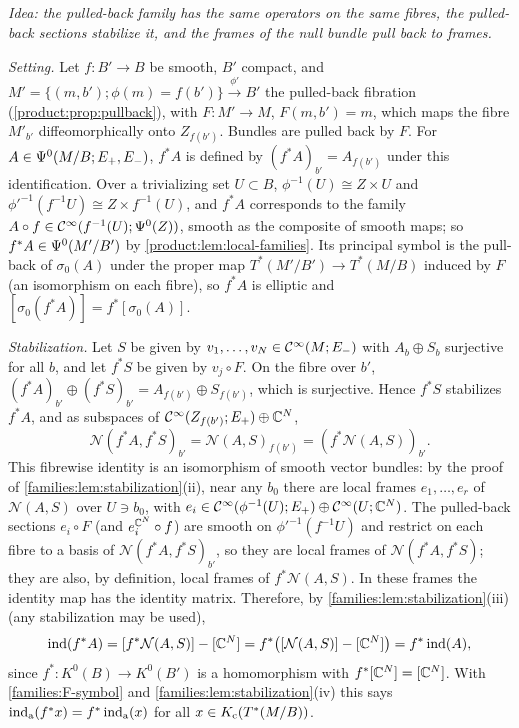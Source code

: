 \subsection*{}
\emph{Idea: the pulled-back family has the same operators on the same fibres, the
pulled-back sections stabilize it, and the frames of the null bundle pull back to
frames.}

\emph{Setting.} Let $f:B'\to B$ be smooth, $B'$ compact, and
$M'=\{(m,b');\phi(m)=f(b')\}\xrightarrow{\phi'}B'$ the pulled-back fibration
(\cref{product:prop:pullback}), with $F:M'\to M$, $F(m,b')=m$, which maps the fibre
$M'_{b'}$ diffeomorphically onto $Z_{f(b')}$. Bundles are pulled back by $F$. For
$A\in\Psi^{0}(M/B;E_+,E_-)$, $f^*A$ is defined by $(f^*A)_{b'}=A_{f(b')}$ under this
identification. Over a trivializing set $U\subset B$, $\phi^{-1}(U)\cong Z\times U$ and
$\phi'^{-1}(f^{-1}U)\cong Z\times f^{-1}(U)$, and $f^*A$ corresponds to the family
$A\circ f\in\mathcal{C}^\infty(f^{-1}(U);\Psi^{0}(Z))$, smooth as the composite of smooth maps; so
$f^*A\in\Psi^{0}(M'/B')$ by \cref{product:lem:local-families}. Its principal symbol is
the pull-back of $\sigma_0(A)$ under the proper map $T^*(M'/B')\to T^*(M/B)$ induced by
$F$ (an isomorphism on each fibre), so $f^*A$ is elliptic and
$[\sigma_0(f^*A)]=f^*[\sigma_0(A)]$.

\emph{Stabilization.} Let $S$ be given by $v_1,\dots,v_N\in\mathcal{C}^\infty(M;E_-)$ with
$A_b\oplus S_b$ surjective for all $b$, and let $f^*S$ be given by $v_j\circ F$. On the
fibre over $b'$, $(f^*A)_{b'}\oplus(f^*S)_{b'}=A_{f(b')}\oplus S_{f(b')}$, which is
surjective. Hence $f^*S$ stabilizes $f^*A$, and as subspaces of
$\mathcal{C}^\infty(Z_{f(b')};E_+)\oplus\mathbb{C}^N$,
\begin{equation*}
\mathcal N(f^*A,f^*S)_{b'}=\mathcal N(A,S)_{f(b')}=(f^*\mathcal N(A,S))_{b'} .
\end{equation*}
This fibrewise identity is an isomorphism of smooth vector bundles: by the proof of
\cref{families:lem:stabilization}(ii), near any $b_0$ there are local frames $e_1,\dots,
e_r$ of $\mathcal N(A,S)$ over $U\ni b_0$, with $e_i\in\mathcal{C}^\infty(\phi^{-1}(U);E_+)\oplus
\mathcal{C}^\infty(U;\mathbb{C}^N)$. The pulled-back sections $e_i\circ F$ (and $e_i^{\mathbb{C}^N}\circ f$) are smooth
on $\phi'^{-1}(f^{-1}U)$ and restrict on each fibre to a basis of
$\mathcal N(f^*A,f^*S)_{b'}$, so they are local frames of $\mathcal N(f^*A,f^*S)$; they are
also, by definition, local frames of $f^*\mathcal N(A,S)$. In these frames the identity
map has the identity matrix. Therefore, by \cref{families:lem:stabilization}(iii) (any
stabilization may be used),
\begin{equation*}
\operatorname{ind}(f^*A)=[f^*\mathcal N(A,S)]-[\mathbb{C}^N]=f^*\bigl([\mathcal N(A,S)]-[\mathbb{C}^N]\bigr)=f^*\operatorname{ind}(A),
\end{equation*}
since $f^*:K^0(B)\to K^0(B')$ is a homomorphism with $f^*[\mathbb{C}^N]=[\mathbb{C}^N]$. With
\ref{families:F-symbol} and \cref{families:lem:stabilization}(iv) this says
$\operatorname{ind}_{\mathrm{a}}(f^*x)=f^*\operatorname{ind}_{\mathrm{a}}(x)$ for all $x\in K_{\mathrm{c}}(T^*(M/B))$.

